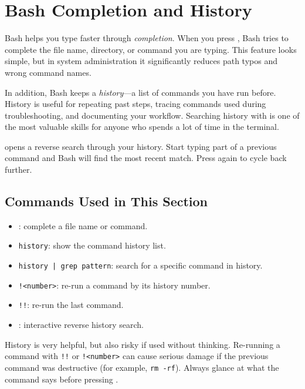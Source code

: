 \section{Bash Completion and History}
\label{sec:completion-history}

Bash helps you type faster through \textit{completion}. When you press
, Bash tries to complete the file name, directory, or command
you are typing. This feature looks simple, but in system administration it
significantly reduces path typos and wrong command names.

In addition, Bash keeps a \textit{history}---a list of commands you have run
before. History is useful for repeating past steps, tracing commands used
during troubleshooting, and documenting your workflow. Searching history with
 is one of the most valuable skills for anyone who spends
a lot of time in the terminal.

\begin{tipbox}
 opens a reverse search through your history. Start typing
part of a previous command and Bash will find the most recent match. Press
 again to cycle back further.
\end{tipbox}

\subsection*{Commands Used in This Section}

\begin{itemize}
  \item {}: complete a file name or command.
  \item \texttt{history}: show the command history list.
  \item \texttt{history | grep pattern}: search for a specific command in history.
  \item \texttt{!<number>}: re-run a command by its history number.
  \item \texttt{!!}: re-run the last command.
  \item {}: interactive reverse history search.
\end{itemize}

\begin{warningbox}
History is very helpful, but also risky if used without thinking. Re-running
a command with \texttt{!!} or \texttt{!<number>} can cause serious damage if
the previous command was destructive (for example, \texttt{rm -rf}).
Always glance at what the command says before pressing .
\end{warningbox}

